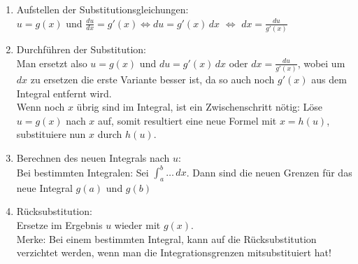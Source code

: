 \begin{enumerate}
	\item Aufstellen der Substitutionsgleichungen:\\
	$u = g(x)$ und $ \frac{du}{dx} = g'(x) \Leftrightarrow du = g'(x) \, dx$ $\Leftrightarrow$ $dx = \frac{du}{g'(x)}$

	\item Durchführen der Substitution:\\
	Man ersetzt also $u = g(x)$ und $du = g'(x) \, dx$ oder $dx = \frac{du}{g'(x)}$, wobei um $dx$ zu ersetzen die erste Variante besser ist, da so auch noch $g'(x)$ aus dem Integral entfernt wird. \\
	Wenn noch $x$ übrig sind im Integral, ist ein Zwischenschritt nötig:
	Löse $u = g(x)$ nach $x$ auf, somit resultiert eine neue Formel mit 
	$x = h(u)$, substituiere nun $x$ durch $h(u)$.

	\item Berechnen des neuen Integrals nach $u$:\\
	Bei bestimmten Integralen: Sei $\int_a^b \ldots \,dx$. Dann sind die neuen
	Grenzen für das neue Integral $g(a)$ und $g(b)$

	\item Rücksubstitution:\\
	Ersetze im Ergebnis $u$ wieder mit $g(x)$. \\
	Merke: Bei einem bestimmten Integral, kann auf die Rücksubstitution verzichtet werden, wenn man die Integrationsgrenzen mitsubstituiert hat!
\end{enumerate}


